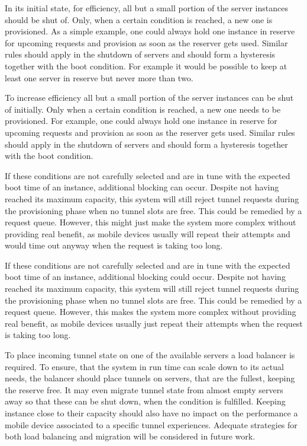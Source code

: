 In its initial state, for efficiency, all but a small portion of the server instances should be shut of. Only, when a certain condition is reached, a new one is provisioned. As a simple example, one could always hold one instance in reserve for upcoming requests and provision as soon as the reserver gets used. Similar rules should apply in the shutdown of servers and should form a hysteresis together with the boot condition. For example it would be possible to keep at least one server in reserve but never more than two.

To increase efficiency all but a small portion of the server instances can be shut of initially. Only when a certain condition is reached, a new one needs to be provisioned. For example, one could always hold one instance in reserve for upcoming requests and provision as soon as the reserver gets used. Similar rules should apply in the shutdown of servers and should form a hysteresis together with the boot condition. 



If these conditions are not carefully selected and are in tune with the expected boot time of an instance, additional blocking can occur. Despite not having reached its maximum capacity, this system will still reject tunnel requests during the provisioning phase when no tunnel slots are free. This could be remedied by a request queue. However, this might just make the system more complex without providing real benefit, as mobile devices usually will repeat their attempts and would time out anyway when the request is taking too long. 

If these conditions are not carefully selected and are in tune with the expected boot time of an instance, additional blocking could occur. Despite not having reached its maximum capacity, this system will still reject tunnel requests during the provisioning phase when no tunnel slots are free. This could be remedied by a request queue. However, this makes the system more complex without providing real benefit, as mobile devices usually just repeat their attempts when the request is taking too long. 


To place incoming tunnel state on one of the available servers a load balancer is required. To ensure, that the system in run time can scale down to its actual needs, the balancer should place tunnels on servers, that are the fullest, keeping the reserve free. It may even migrate tunnel state from almost empty servers away so that these can be shut down, when the condition is fulfilled. Keeping instance close to their capacity should also have no impact on the performance a mobile device associated to a specific tunnel experiences. Adequate strategies for both load balancing and migration will be considered in future work.

